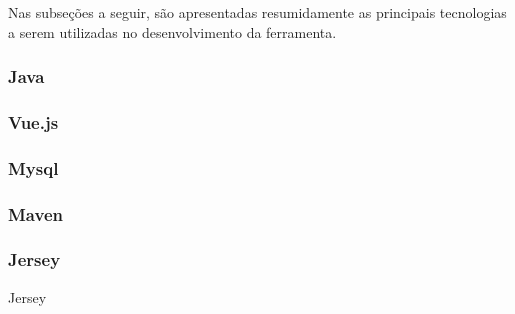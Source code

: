 Nas subseções a seguir, são apresentadas resumidamente as principais tecnologias a serem utilizadas no desenvolvimento da 
ferramenta.

\subsubsection{Java}
\subsubsection{Vue.js}
\subsubsection{Mysql}
\subsubsection{Maven}
\subsubsection{Jersey}
Jersey




